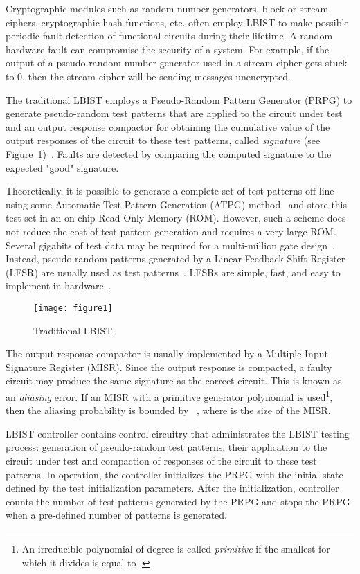 \documentclass[a4paper]{llncs}
\begin{document}
Cryptographic modules such as random number generators, block or stream ciphers, cryptographic hash functions, etc. often employ LBIST to make possible periodic fault detection of functional circuits during their lifetime. A random hardware fault can compromise the security of a system. For example, if the output of a pseudo-random number generator used in a stream cipher gets stuck to 0, then the stream cipher will be sending messages unencrypted.

The traditional LBIST employs a Pseudo-Random Pattern Generator (PRPG) 
to generate pseudo-random test patterns that are applied to the circuit under test and an output response compactor for obtaining the cumulative value of the output responses of the circuit to these test patterns, called {\em signature} (see Figure~\ref{f1})~\cite{LiCDP15}. Faults are detected by comparing the computed signature to the expected "good" signature.

Theoretically, it is possible to generate a complete set of test patterns off-line using some Automatic Test
Pattern Generation (ATPG) method~\cite{atpg} and store this test set in an on-chip Read Only Memory (ROM). However, such a
scheme does not reduce the cost of test pattern generation and requires a very large ROM. Several gigabits of
test data may be required for a multi-million gate design~\cite{HeF99}. 
Instead, pseudo-random patterns generated by
a Linear Feedback Shift Register (LFSR) are usually used as test patterns~\cite{McMMW88}. 
LFSRs are simple, fast, and easy to implement in hardware~\cite{Golomb_book}.

\begin{figure}[t!]
\begin{center}
\texttt{[image: figure1]}
\caption{Traditional LBIST.}\label{f1} 
\end{center}
\end{figure}

The output response compactor is usually implemented by a  
Multiple Input Signature Register  (MISR). Since the output response is compacted, a faulty circuit may produce the same signature as the correct circuit. This is known as an {\em aliasing} error. If an MISR with a primitive generator polynomial is used\footnote{An irreducible polynomial of degree  is called {\em primitive} if the smallest  for which it divides  is equal to \cite{Golomb_book}.}, then the aliasing probability is bounded by ~\cite{DaOFE90}, where  is the size of the MISR. 

LBIST controller contains control circuitry that administrates the LBIST testing process: generation of pseudo-random test patterns, their application to the circuit under test and compaction of responses of the circuit to these test patterns. In operation, the controller initializes the PRPG with the initial state defined by the test initialization parameters. After the initialization, controller counts the number of test patterns generated by the  
PRPG and stops the PRPG when a pre-defined number of patterns is generated. 
\end{document}
